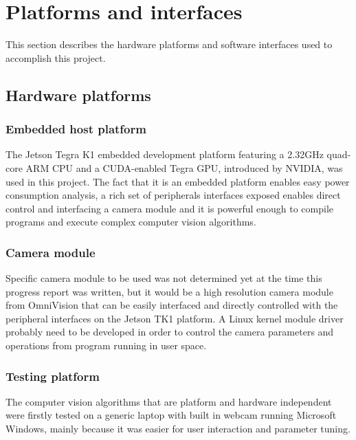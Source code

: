 \chapter{Platforms and interfaces}

This section describes the hardware platforms and software interfaces used to accomplish this project.

\section{Hardware platforms}

\subsection{Embedded host platform}

The Jetson Tegra K1 embedded development platform \cite{NVIDIA:tk1} featuring a 2.32GHz quad-core ARM CPU and a CUDA-enabled Tegra GPU, introduced by NVIDIA, was used in this project. The fact that it is an embedded platform enables easy power consumption analysis, a rich set of peripherals interfaces exposed enables direct control and interfacing a camera module and it is powerful enough to compile programs and execute complex computer vision algorithms.

\subsection{Camera module}
\label{hwsw:camera}

Specific camera module to be used was not determined yet at the time this progress report was written, but it would be a high resolution camera module from OmniVision \cite{ovt} that can be easily interfaced and directly controlled with the peripheral interfaces on the Jetson TK1 platform. A Linux kernel module driver probably need to be developed in order to control the camera parameters and operations from program running in user space.

\subsection{Testing platform}

The computer vision algorithms that are platform and hardware independent were firstly tested on a generic laptop with built in webcam running Microsoft Windows, mainly because it was easier for user interaction and parameter tuning.

